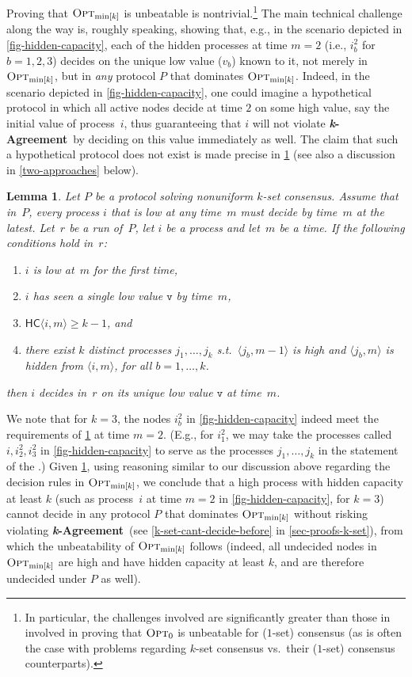 \documentclass[11pt]{article}
\newtheorem{lemma}{Lemma}
\theoremstyle{definition}
\newcommand{\OptMink}{\mbox{$\mbox{\sc Opt}_{\min[k]}$}}
\newcommand{\defemph}[1]{\textbf{\textit{#1}}}
\newcommand{\OptZ}{\mbox{$\mbox{{\sc Opt}}_0$}}
\newcommand{\node}[1]{\langle#1\rangle}
\newcommand{\kAgreement}{{\bf \defemph{k}-Agreement}}
\newcommand{\valv}{\veee}
\newcommand{\veee}{\mathtt{v}}
\newcommand{\HC}[1]{\mathsf{HC}\node{#1}}
\begin{document}
Proving that $\OptMink$ is unbeatable
is nontrivial.\footnote{In particular, the challenges involved are significantly greater than those in involved in proving that $\OptZ$ is unbeatable for ($1$-set) consensus (as is often the case with problems regarding $k$-set consensus vs.\ their ($1$-set) consensus counterparts).} The main technical challenge along the way is,
roughly speaking, showing that, e.g., in the scenario depicted in \cref{fig-hidden-capacity}, each of the
hidden
processes at time $m\!=\!2$ (i.e., $i^2_b$ for $b=1,2,3$) decides on the
unique low value ($v_b$) known to it, not merely in $\OptMink$, but in \emph{any} protocol $P$ that dominates $\OptMink$. Indeed, in the scenario depicted in \cref{fig-hidden-capacity}, one could imagine a hypothetical protocol in which all active nodes decide at time $2$ on some high value, say the initial value of process~$i$, thus guaranteeing that $i$ will not violate \kAgreement\ by deciding on this value immediately as well.
The claim that such a hypothetical protocol does not exist is made precise in \cref{two-face}
(see also a discussion in \cref{two-approaches}
below).

\begin{lemma}
\label{two-face}
Let $P$ be a protocol solving nonuniform $k$-set consensus.
Assume that in~$P$, every process $i$ that is low at any time~$m$
must decide by time~$m$ at the latest.
Let~$r$ be a run of~$P$,
let $i$ be a process and let~$m$ be a time.
If the following conditions hold in~$r$:
\begin{enumerate}
\item\label{two-face-first-time}
$i$ is low at~$m$ for the first time,
\item
$i$ has seen a single low value
$\valv$
by time~$m$,
\item
$\HC{i,m}\ge k-1$, and
\item
there exist $k$ distinct processes $j_1,\ldots,j_k$
s.t.\ $\node{j_b,m-1}$
is high
and $\node{j_b,m}$ is hidden from $\node{i,m}$,
for all $b=1,\ldots,k$.
\end{enumerate}
then $i$ decides in~$r$ on its unique low value $\valv$ at time~$m$.
\end{lemma}
\noindent
We note that for
$k=3$, the nodes $i^2_b$ in \cref{fig-hidden-capacity} indeed meet the requirements of \cref{two-face} at time $m=2$. (E.g., for $i^2_1$, we may take the processes called $i,i^2_2,i^2_3$ in \cref{fig-hidden-capacity} to serve as the processes $j_1,\ldots,j_k$ in the statement of the .)
Given \cref{two-face}, using reasoning similar to our discussion above regarding the decision rules in $\OptMink$, we conclude that
a high process with hidden capacity at least $k$ (such as process~$i$ at time $m=2$ in \cref{fig-hidden-capacity}, for $k=3$) cannot decide in
any protocol $P$ that dominates $\OptMink$
without risking violating \kAgreement\ (see \cref{k-set-cant-decide-before} in \cref{sec-proofs-k-set}), from which the
unbeatability
of $\OptMink$ follows (indeed, all undecided nodes in $\OptMink$ are high
and have hidden capacity at least $k$,
and are therefore undecided under $P$ as well).
\end{document}
